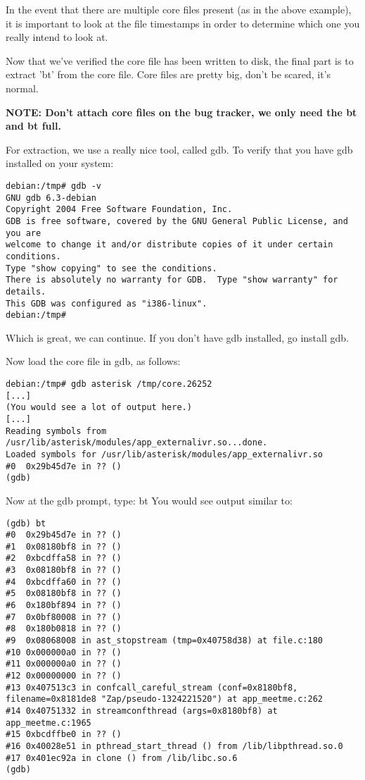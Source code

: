 In the event that there are multiple core files present (as in the
above example), it is important to look at the file timestamps in
order to determine which one you really intend to look at.

Now that we've verified the core file has been written to disk, the
final part is to extract 'bt' from the core file. Core files are
pretty big, don't be scared, it's normal.

\textbf{NOTE: Don't attach core files on the bug tracker, we only need the bt and bt full.}

For extraction, we use a really nice tool, called gdb. To verify that
you have gdb installed on your system:

\begin{astlisting}
\begin{verbatim}
debian:/tmp# gdb -v
GNU gdb 6.3-debian
Copyright 2004 Free Software Foundation, Inc.
GDB is free software, covered by the GNU General Public License, and you are
welcome to change it and/or distribute copies of it under certain conditions.
Type "show copying" to see the conditions.
There is absolutely no warranty for GDB.  Type "show warranty" for details.
This GDB was configured as "i386-linux".
debian:/tmp#
\end{verbatim}
\end{astlisting}

Which is great, we can continue. If you don't have gdb installed, go install gdb.

Now load the core file in gdb, as follows:

\begin{astlisting}
\begin{verbatim}
debian:/tmp# gdb asterisk /tmp/core.26252
[...]
(You would see a lot of output here.)
[...]
Reading symbols from /usr/lib/asterisk/modules/app_externalivr.so...done.
Loaded symbols for /usr/lib/asterisk/modules/app_externalivr.so
#0  0x29b45d7e in ?? ()
(gdb)
\end{verbatim}
\end{astlisting}

Now at the gdb prompt, type: bt
You would see output similar to:

\begin{astlisting}
\begin{verbatim}
(gdb) bt
#0  0x29b45d7e in ?? ()
#1  0x08180bf8 in ?? ()
#2  0xbcdffa58 in ?? ()
#3  0x08180bf8 in ?? ()
#4  0xbcdffa60 in ?? ()
#5  0x08180bf8 in ?? ()
#6  0x180bf894 in ?? ()
#7  0x0bf80008 in ?? ()
#8  0x180b0818 in ?? ()
#9  0x08068008 in ast_stopstream (tmp=0x40758d38) at file.c:180
#10 0x000000a0 in ?? ()
#11 0x000000a0 in ?? ()
#12 0x00000000 in ?? ()
#13 0x407513c3 in confcall_careful_stream (conf=0x8180bf8, filename=0x8181de8 "Zap/pseudo-1324221520") at app_meetme.c:262
#14 0x40751332 in streamconfthread (args=0x8180bf8) at app_meetme.c:1965
#15 0xbcdffbe0 in ?? ()
#16 0x40028e51 in pthread_start_thread () from /lib/libpthread.so.0
#17 0x401ec92a in clone () from /lib/libc.so.6
(gdb)
\end{verbatim}
\end{astlisting}

